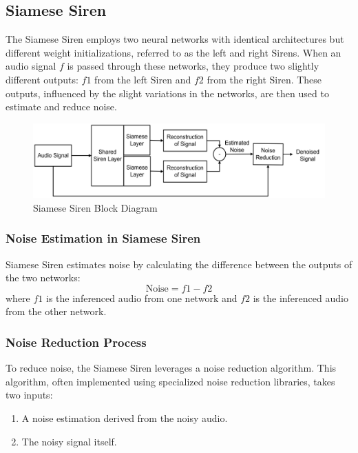 \documentclass{ioereport}
\begin{document}
    \subsection{Siamese Siren}

    The Siamese Siren employs two neural networks with identical architectures but different weight initializations, referred to as the left and right Sirens. When an audio signal \( f \) is passed through these networks, they produce two slightly different outputs: \( f1 \) from the left Siren and \( f2 \) from the right Siren. These outputs, influenced by the slight variations in the networks, are then used to estimate and reduce noise.
    \begin{figure}[H]
        \centering
        \includegraphics[width=\linewidth]{assets/Siamese_Siren_Block_Diagram.png}
        \caption{Siamese Siren Block Diagram}
        \label{fig:Siamese_Siren_Block_Diagram}
    \end{figure}

    \subsubsection{Noise Estimation in Siamese Siren}
    
    Siamese Siren estimates noise by calculating the difference between the outputs of the two networks:
    \begin{equation}
        \text{Noise} = f1 - f2
    \end{equation}
    where \( f1 \) is the inferenced audio from one network and \( f2 \) is the inferenced audio from the other network.
    
    \subsubsection{Noise Reduction Process}
    
    To reduce noise, the Siamese Siren leverages a noise reduction algorithm. This algorithm, often implemented using specialized noise reduction libraries, takes two inputs:
    \begin{enumerate}
        \item A noise estimation derived from the noisy audio.
        \item The noisy signal itself.
    \end{enumerate}
\end{document}

